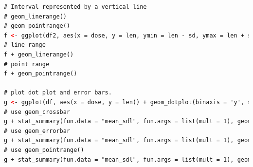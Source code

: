 \begin{lstlisting}[language=html]
# Interval represented by a vertical line
# geom_linerange()
# geom_pointrange()
f <- ggplot(df2, aes(x = dose, y = len, ymin = len - sd, ymax = len + sd))
# line range
f + geom_linerange()
# point range
f + geom_pointrange()

# plot dot plot and error bars.
g <- ggplot(df, aes(x = dose, y = len)) + geom_dotplot(binaxis = 'y', stackdir = 'center')
# use geom_crossbar
g + stat_summary(fun.data = "mean_sdl", fun.args = list(mult = 1), geom = "crossbar", width = 0.5)
# use geom_errorbar
g + stat_summary(fun.data = "mean_sdl", fun.args = list(mult = 1), geom = "errorbar",color = "red", width = 0.2) + stat_summary(fun.y = mean, geom = "point", color = "red")
# use geom_pointrange()
g + stat_summary(fun.data = "mean_sdl", fun.args = list(mult = 1), geom = "pointrange", color = "red")
\end{lstlisting}


